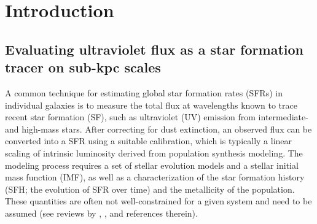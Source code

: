 \chapter{Introduction}
\label{introduction}

%
%
%
%
%




\section{Evaluating ultraviolet flux as a star formation tracer on sub-kpc scales}

A common technique for estimating global star formation rates (SFRs) in
individual galaxies is to measure the total flux at wavelengths known to trace
recent star formation (SF), such as ultraviolet (UV) emission from
intermediate- and high-mass stars. After correcting for dust extinction, an
observed flux can be converted into a SFR using a suitable calibration, which
is typically a linear scaling of intrinsic luminosity derived from population
synthesis modeling. The modeling process requires a set of stellar evolution
models and a stellar initial mass function (IMF), as well as a characterization
of the star formation history (SFH; the evolution of SFR over time) and the
metallicity of the population. These quantities are often not well-constrained
for a given system and need to be assumed (see reviews by
\citealt{Kennicutt:1998}, \citealt{Kennicutt:2012}, and references therein).

